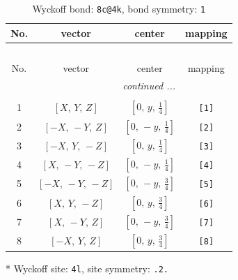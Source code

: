 \documentclass[fleqn,8pt]{jsarticle}
\begin{document}
\renewcommand{\arraystretch}{1.2}
\begin{longtable}{cccc}
\caption{Wyckoff bond: {\tt 8c@4k}, bond symmetry: {\tt 1}}
 \\
 \hline \hline
No. & vector & center & mapping \\ \hline \endfirsthead

\multicolumn{3}{l}{\tablename\ \thetable{}} \\
 \hline \hline
No. & vector & center & mapping \\ \hline \endhead

 \hline \hline
\multicolumn{3}{r}{\footnotesize\it continued ...} \\ \endfoot

 \hline \hline
\multicolumn{3}{r}{} \\ \endlastfoot

1 & $\left[ X,\, Y,\, Z \right]$ & $\left[ 0,\, y,\, \frac{1}{4} \right]$ & {\tt [1]} \\ \hline
2 & $\left[ - X,\, - Y,\, Z \right]$ & $\left[ 0,\, - y,\, \frac{1}{4} \right]$ & {\tt [2]} \\ \hline
3 & $\left[ - X,\, Y,\, - Z \right]$ & $\left[ 0,\, y,\, \frac{1}{4} \right]$ & {\tt [3]} \\ \hline
4 & $\left[ X,\, - Y,\, - Z \right]$ & $\left[ 0,\, - y,\, \frac{1}{4} \right]$ & {\tt [4]} \\ \hline
5 & $\left[ - X,\, - Y,\, - Z \right]$ & $\left[ 0,\, - y,\, \frac{3}{4} \right]$ & {\tt [5]} \\ \hline
6 & $\left[ X,\, Y,\, - Z \right]$ & $\left[ 0,\, y,\, \frac{3}{4} \right]$ & {\tt [6]} \\ \hline
7 & $\left[ X,\, - Y,\, Z \right]$ & $\left[ 0,\, - y,\, \frac{3}{4} \right]$ & {\tt [7]} \\ \hline
8 & $\left[ - X,\, Y,\, Z \right]$ & $\left[ 0,\, y,\, \frac{3}{4} \right]$ & {\tt [8]} \\
\end{longtable}
* Wyckoff site: {\tt 4l}, site symmetry: {\tt .2.}
\renewcommand{\arraystretch}{1.2}
\end{document}
